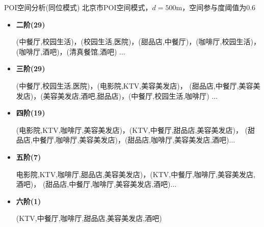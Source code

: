 \begin{frame}[c]{POI空间分析(同位模式)}
    北京市POI空间模式，$d=500$m，空间参与度阈值为$0.6$

    \begin{itemize}
        \footnotesize
        \pause
        \item \textbf{二阶(29)}

        (中餐厅,校园生活)，(校园生活,医院)，(甜品店,中餐厅)，(咖啡厅,校园生活)，(咖啡厅,酒吧)，(清真餐馆,酒吧) $\ldots$

        \pause
        \item \textbf{三阶(29)}

        (中餐厅,校园生活,医院)，(电影院,KTV,美容美发店)，
        (甜品店,中餐厅,美容美发店)，(美容美发店,酒吧,甜品店)，(中餐厅,校园生活,咖啡厅) $\ldots$

        \pause
        \item \textbf{四阶(19)}

        (电影院,KTV,咖啡厅,美容美发店)，(KTV,中餐厅,甜品店,美容美发店)，
        (甜品店,中餐厅,咖啡厅,美容美发店)，(甜品店,咖啡厅,美容美发店,酒吧)$\ldots$

        \pause
        \item \textbf{五阶(7)}

        电影院,KTV,咖啡厅,甜品店,美容美发店)，(KTV,中餐厅,咖啡厅,美容美发店,酒吧)，
        (甜品店,中餐厅,咖啡厅,美容美发店,酒吧)$\ldots$

        \pause
        \item \textbf{六阶(1)}

        (KTV,中餐厅,咖啡厅,甜品店,美容美发店,酒吧)
    \end{itemize}
\end{frame}
